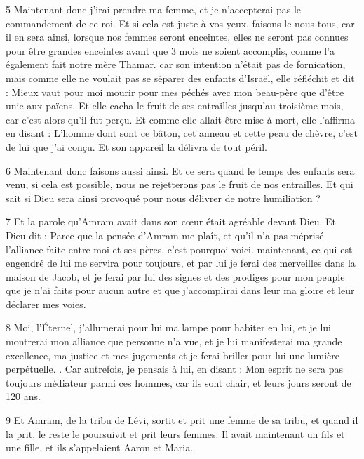 \par 5 Maintenant donc j'irai prendre ma femme, et je n'accepterai pas le commandement de ce roi. Et si cela est juste à vos yeux, faisons-le nous tous, car il en sera ainsi, lorsque nos femmes seront enceintes, elles ne seront pas connues pour être grandes enceintes avant que 3 mois ne soient accomplis, comme l'a également fait notre mère Thamar. car son intention n'était pas de fornication, mais comme elle ne voulait pas se séparer des enfants d'Israël, elle réfléchit et dit : Mieux vaut pour moi mourir pour mes péchés avec mon beau-père que d'être unie aux païens. Et elle cacha le fruit de ses entrailles jusqu'au troisième mois, car c'est alors qu'il fut perçu. Et comme elle allait être mise à mort, elle l'affirma en disant : L'homme dont sont ce bâton, cet anneau et cette peau de chèvre, c'est de lui que j'ai conçu. Et son appareil la délivra de tout péril.

\par 6 Maintenant donc faisons aussi ainsi. Et ce sera quand le temps des enfants sera venu, si cela est possible, nous ne rejetterons pas le fruit de nos entrailles. Et qui sait si Dieu sera ainsi provoqué pour nous délivrer de notre humiliation ?

\par 7 Et la parole qu'Amram avait dans son cœur était agréable devant Dieu. Et Dieu dit : Parce que la pensée d'Amram me plaît, et qu'il n'a pas méprisé l'alliance faite entre moi et ses pères, c'est pourquoi voici. maintenant, ce qui est engendré de lui me servira pour toujours, et par lui je ferai des merveilles dans la maison de Jacob, et je ferai par lui des signes et des prodiges pour mon peuple que je n'ai faits pour aucun autre et que j'accomplirai dans leur ma gloire et leur déclarer mes voies.

\par 8 Moi, l'Éternel, j'allumerai pour lui ma lampe pour habiter en lui, et je lui montrerai mon alliance que personne n'a vue, et je lui manifesterai ma grande excellence, ma justice et mes jugements et je ferai briller pour lui une lumière perpétuelle. . Car autrefois, je pensais à lui, en disant : Mon esprit ne sera pas toujours médiateur parmi ces hommes, car ils sont chair, et leurs jours seront de 120 ans.

\par 9 Et Amram, de la tribu de Lévi, sortit et prit une femme de sa tribu, et quand il la prit, le reste le poursuivit et prit leurs femmes. Il avait maintenant un fils et une fille, et ils s'appelaient Aaron et Maria.

